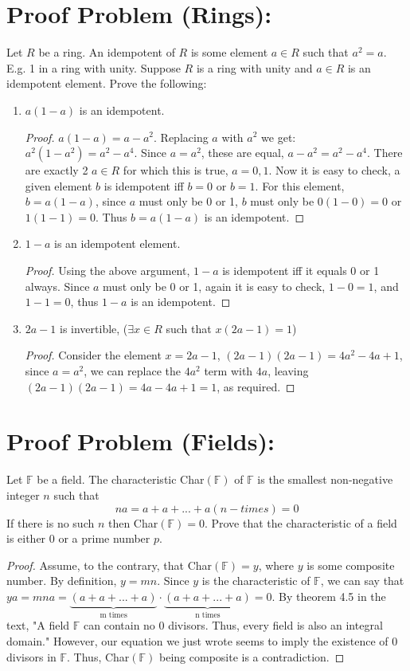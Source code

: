 \documentclass[12pt]{article}
\title{\scalebox{2}{Math 431 Final Exam}}
\author{\scalebox{1.5}{Theo Koss}}
\date{December 2020}
\newcommand{\F}{\mathbb{F}}
\begin{document}
\maketitle
\section{Proof Problem (Rings):}
Let $R$ be a ring. An idempotent of $R$ is some element $a\in R$ such that $a^2=a$. E.g. 1 in a ring with unity. Suppose $R$ is a ring with unity and $a\in R$ is an idempotent element. Prove the following:
\begin{enumerate}[label=(\alph*)]
    \item $a(1-a)$ is an idempotent.
    \begin{proof}
    $a(1-a)=a-a^2$. Replacing $a$ with $a^2$ we get: $a^2(1-a^2)=a^2-a^4$. Since $a=a^2$, these are equal, $a-a^2=a^2-a^4$. There are exactly 2 $a\in R$ for which this is true, $a=0,1$. Now it is easy to check, a given element $b$ is idempotent iff $b=0$ or $b=1$. For this element, $b=a(1-a)$, since $a$ must only be 0 or 1, $b$ must only be $0(1-0)=0$ or $1(1-1)=0$. Thus $b=a(1-a)$ is an idempotent.
    \end{proof}
    \item $1-a$ is an idempotent element. \begin{proof}
    Using the above argument, $1-a$ is idempotent iff it equals 0 or 1 always. Since $a$ must only be 0 or 1, again it is easy to check, $1-0=1$, and $1-1=0$, thus $1-a$ is an idempotent.\end{proof}
    \item $2a-1$ is invertible, ($\exists x\in R$ such that $x(2a-1)=1$)
    \begin{proof}
    Consider the element $x=2a-1$, $(2a-1)(2a-1)=4a^2-4a+1$, since $a=a^2$, we can replace the $4a^2$ term with $4a$, leaving $(2a-1)(2a-1)=4a-4a+1=1$, as required.
    \end{proof}
\end{enumerate}
\section{Proof Problem (Fields):}
Let $\F$ be a field. The characteristic Char$(\F)$ of $\F$ is the smallest non-negative integer $n$ such that $$na=a+a+...+a (n-times)=0$$ If there is no such $n$ then Char$(\F)=0$. Prove that the characteristic of a field is either 0 or a prime number $p$.
\begin{proof}
Assume, to the contrary, that Char$(\F)=y$, where $y$ is some composite number. By definition, $y=mn$. Since $y$ is the characteristic of $\F$, we can say that $ya=mna=\underbrace{(a+a+...+a)}_\text{m times}\cdot\underbrace{(a+a+...+a)}_\text{n times}=0$. By theorem 4.5 in the text, "A field $\F$ can contain no 0 divisors. Thus, every field is also an integral domain." However, our equation we just wrote seems to imply the existence of 0 divisors in $\F$. Thus, Char$(\F)$ being composite is a contradiction.
\end{proof}
\end{document}
